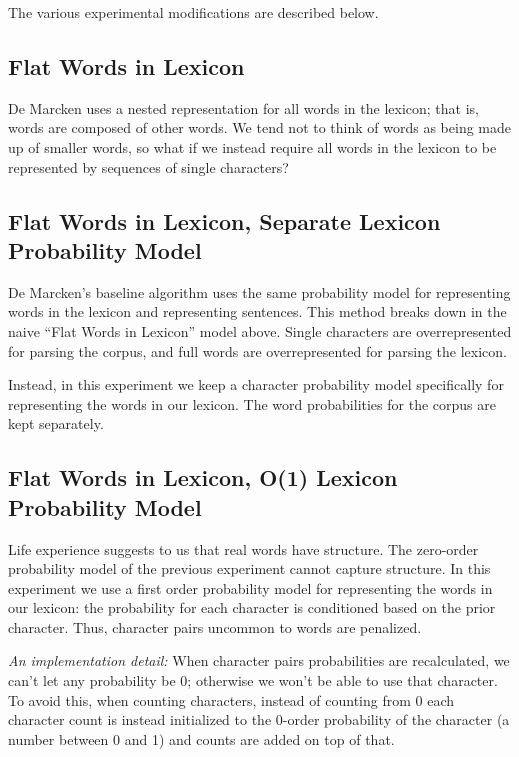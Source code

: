 \documentclass[11pt, oneside, fleqn]{article}
\begin{document}
	The various experimental modifications are described below.

  \subsection{Flat Words in Lexicon}
  
  De Marcken uses a nested representation for all words in the lexicon; that is, words are composed of other words. We tend not to think of words as being made up of smaller words, so what if we instead require all words in the lexicon to be represented by sequences of single characters?

  \subsection{Flat Words in Lexicon, Separate Lexicon Probability Model}

	De Marcken's baseline algorithm uses the same probability model for representing words in the lexicon and representing sentences. This method breaks down in the naive ``Flat Words in Lexicon'' model above. Single characters are overrepresented for parsing the corpus, and full words are overrepresented for parsing the lexicon.
	
	Instead, in this experiment we keep a character probability model specifically for representing the words in our lexicon. The word probabilities for the corpus are kept separately.

  \subsection{Flat Words in Lexicon, O(1) Lexicon Probability Model}

	Life experience suggests to us that real words have structure. The zero-order probability model of the previous experiment cannot capture structure. In this experiment we use a first order probability model for representing the words in our lexicon: the probability for each character is conditioned based on the prior character. Thus, character pairs uncommon to words are penalized.
	
	\textit{An implementation detail:} When character pairs probabilities are recalculated, we can't let any probability be 0; otherwise we won't be able to use that character. To avoid this, when counting characters, instead of counting from 0 each character count is instead initialized to the 0-order probability of the character (a number between 0 and 1) and counts are added on top of that.
\end{document}

